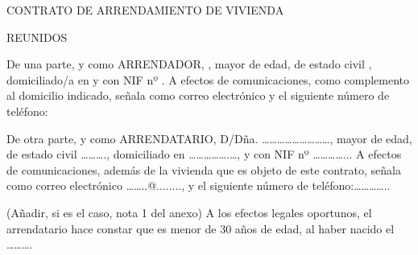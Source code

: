 \documentclass[12pt]{article}
\begin{document}
CONTRATO DE ARRENDAMIENTO DE VIVIENDA


    REUNIDOS

     

    De una parte, y como ARRENDADOR,  , mayor de edad, de estado civil , domiciliado/a en  y con NIF nº . A efectos de comunicaciones, como complemento al domicilio indicado, señala como correo electrónico  y el siguiente número de teléfono: 

      

      De otra parte, y como ARRENDATARIO, D/Dña. ………………………, mayor de edad, de estado civil ………., domiciliado en …………….…, y con NIF nº …………... A efectos de comunicaciones, además de la vivienda que es objeto de este contrato, señala como correo electrónico ……..@........, y el siguiente número de teléfono:………….. 

      (Añadir, si es el caso, nota 1 del anexo) A los efectos legales oportunos, el arrendatario hace constar que es menor de 30 años de edad, al haber nacido el ……….

                 
\end{document}
